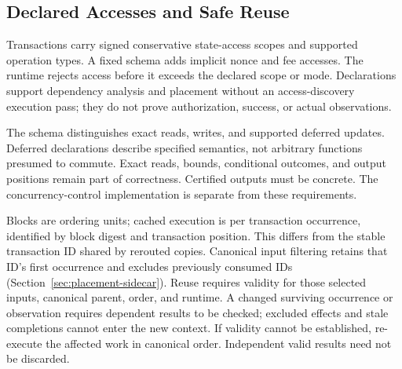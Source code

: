 
\subsection{Declared Accesses and Safe Reuse}

Transactions carry signed conservative state-access scopes and supported operation types. A fixed schema adds implicit nonce and fee accesses. The runtime rejects access before it exceeds the declared scope or mode. Declarations support dependency analysis and placement without an access-discovery execution pass; they do not prove authorization, success, or actual observations.

The schema distinguishes exact reads, writes, and supported deferred updates. Deferred declarations describe specified semantics, not arbitrary functions presumed to commute. Exact reads, bounds, conditional outcomes, and output positions remain part of correctness. Certified outputs must be concrete. The concurrency-control implementation is separate from these requirements.

Blocks are ordering units; cached execution is per transaction occurrence, identified by block digest and transaction position. This differs from the stable transaction ID shared by rerouted copies. Canonical input filtering retains that ID's first occurrence and excludes previously consumed IDs (Section~\ref{sec:placement-sidecar}). Reuse requires validity for those selected inputs, canonical parent, order, and runtime. A changed surviving occurrence or observation requires dependent results to be checked; excluded effects and stale completions cannot enter the new context. If validity cannot be established, re-execute the affected work in canonical order. Independent valid results need not be discarded.


